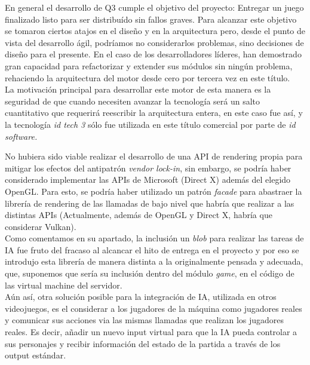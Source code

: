 \documentclass[a4paper,12pt]{report}
\begin{document}
    En general el desarrollo de Q3 cumple el objetivo del proyecto: Entregar un juego finalizado listo para ser distribuído sin fallos graves. Para alcanzar este objetivo se tomaron ciertos atajos en el diseño y en la arquitectura pero, desde el punto de vista del desarrollo ágil, podríamos no considerarlos problemas, sino decisiones de diseño para el presente. En el caso de los desarrolladores líderes, han demostrado gran capacidad para refactorizar y extender sus módulos sin ningún problema, rehaciendo la arquitectura del motor desde cero por tercera vez en este título.\\
    
    La motivación principal para desarrollar este motor de esta manera es la seguridad de que cuando necesiten avanzar la tecnología será un salto cuantitativo que requerirá reescribir la arquitectura entera, en este caso fue así, y la tecnología \textit{id tech 3} sólo fue utilizada en este título comercial por parte de \textit{id software.}
    
    No hubiera sido viable realizar el desarrollo de una API de rendering propia para mitigar los efectos del antipatrón \textit{vendor lock-in}, sin embargo, se podría haber considerado implementar las APIs de Microsoft (Direct X) además del elegido OpenGL. Para esto, se podría haber utilizado un patrón \textit{facade} para abastraer la librería de rendering de las llamadas de bajo nivel que habría que realizar a las distintas APIs (Actualmente, además de OpenGL y Direct X, habría que considerar Vulkan).\\
    
    Como comentamos en su apartado, la inclusión un \textit{blob} para realizar las tareas de IA fue fruto del fracaso al alcancar el hito de entrega en el proyecto y por eso se introdujo esta librería de manera distinta a la originalmente pensada y adecuada, que, suponemos que sería su inclusión dentro del módulo \textit{game}, en el código de las virtual machine del servidor.\\
    
    Aún así, otra solución posible para la integración de IA, utilizada en otros videojuegos, es el considerar a los jugadores de la máquina como jugadores reales y comunicar sus acciones via las mismas llamadas que realizan los jugadores reales. Es decir, añadir un nuevo input virtual para que la IA pueda controlar a sus personajes y recibir información del estado de la partida a través de los output estándar.\\
    
\end{document}
